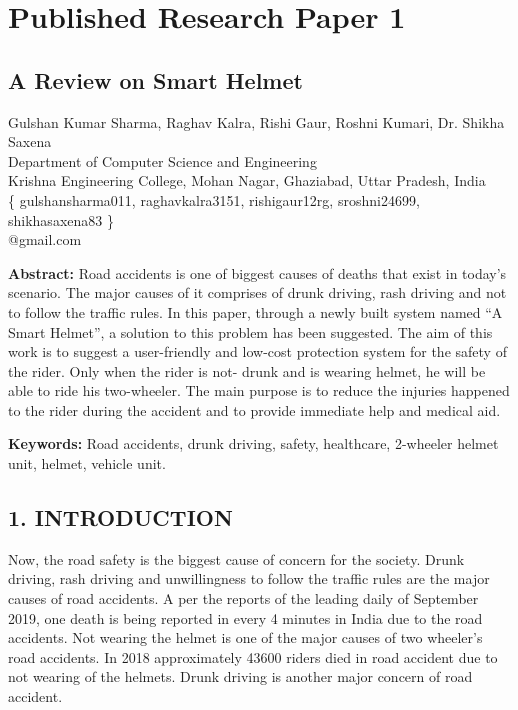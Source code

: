 \chapter*{Published Research Paper 1}



	\section*{A Review on Smart Helmet}
\vspace{.3cm}

\begin{center}
	Gulshan Kumar Sharma, Raghav Kalra, Rishi Gaur, Roshni Kumari, Dr. Shikha Saxena
\\Department of Computer Science and Engineering
\\Krishna Engineering College, Mohan Nagar, Ghaziabad, Uttar Pradesh, India
\\ \{ gulshansharma011, raghavkalra3151, rishigaur12rg, sroshni24699, shikhasaxena83 \}   \\@gmail.com
\vspace{.3cm}
\end{center}
\textbf{Abstract:} Road accidents is one of biggest causes of deaths that exist in today’s scenario. The major causes of it comprises of drunk driving, rash driving and not to follow the traffic rules. In this paper, through a newly built system named “A Smart Helmet”, a solution to this problem has been suggested. The aim of this work is to suggest a user-friendly and low-cost protection system for the safety of the rider. Only when the rider is not- drunk and is wearing helmet, he will be able to ride his two-wheeler. The main purpose is to reduce the injuries happened to the rider during the accident and to provide immediate help and medical aid.
\vspace{.3cm}

\textbf{Keywords:} Road accidents, drunk driving, safety, healthcare, 2-wheeler helmet unit, helmet, vehicle unit.

\section*{1. INTRODUCTION}
Now, the road safety is the biggest cause of concern for the society. Drunk driving, rash driving and unwillingness to follow the traffic rules are the major causes of road accidents. A per the reports of the leading daily of September 2019, one death is being reported in every 4 minutes in India due to the road accidents. Not wearing the helmet is one of the major causes of two wheeler’s road accidents. In 2018 approximately 43600 riders died in road accident due to not wearing of the helmets. Drunk driving is another major concern of road accident.\vspace{.3cm}
 
